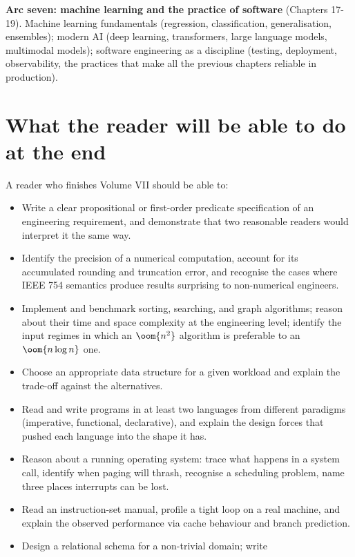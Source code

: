 \textbf{Arc seven: machine learning and the practice of software} (Chapters 17-19). Machine learning fundamentals (regression, classification, generalisation, ensembles); modern AI (deep learning, transformers, large language models, multimodal models); software engineering as a discipline (testing, deployment, observability, the practices that make all the previous chapters reliable in production).

\section*{What the reader will be able to do at the end}

A reader who finishes Volume VII should be able to:

\begin{itemize}[leftmargin=*]
  \item Write a clear propositional or first-order predicate
    specification of an engineering requirement, and demonstrate
    that two reasonable readers would interpret it the same way.
  \item Identify the precision of a numerical computation, account
    for its accumulated rounding and truncation error, and
    recognise the cases where IEEE 754 semantics produce results
    surprising to non-numerical engineers.
  \item Implement and benchmark sorting, searching, and graph
    algorithms; reason about their time and space complexity at
    the engineering level; identify the input regimes in which an
    $\oom{n^{2}}$ algorithm is preferable to an $\oom{n \log n}$
    one.
  \item Choose an appropriate data structure for a given workload
    and explain the trade-off against the alternatives.
  \item Read and write programs in at least two languages from
    different paradigms (imperative, functional, declarative), and
    explain the design forces that pushed each language into the
    shape it has.
  \item Reason about a running operating system: trace what happens
    in a system call, identify when paging will thrash, recognise
    a scheduling problem, name three places interrupts can be
    lost.
  \item Read an instruction-set manual, profile a tight loop on a
    real machine, and explain the observed performance via cache
    behaviour and branch prediction.
  \item Design a relational schema for a non-trivial domain; write

\end{itemize}
